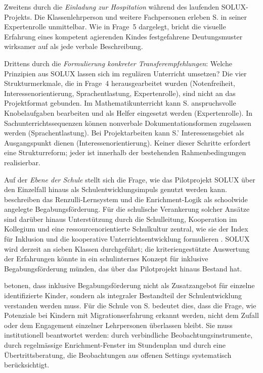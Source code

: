\documentclass[ngerman, a4paper]{article}
\begin{document}
Zweitens durch die \textit{Einladung zur Hospitation} während des laufenden
SOLUX-Projekts. Die Klassenlehrperson und weitere Fachpersonen erleben S. in
seiner Expertenrolle unmittelbar. Wie in Frage~5 dargelegt, bricht die
visuelle Erfahrung eines kompetent agierenden Kindes festgefahrene
Deutungsmuster wirksamer auf als jede verbale Beschreibung.

Drittens durch die \textit{Formulierung konkreter Transferempfehlungen}:
Welche Prinzipien aus SOLUX lassen sich im regulären Unterricht umsetzen?
Die vier Strukturmerkmale, die in Frage~4 herausgearbeitet wurden
(Notenfreiheit, Interessenorientierung, Sprachentlastung, Expertenrolle),
sind nicht an das Projektformat gebunden. Im Mathematikunterricht kann S.
anspruchsvolle Knobelaufgaben bearbeiten und als Helfer eingesetzt werden
(Expertenrolle). In Sachunterrichtssequenzen können nonverbale
Dokumentationsformen zugelassen werden (Sprachentlastung). Bei
Projektarbeiten kann S.' Interessensgebiet als Ausgangspunkt dienen
(Interessenorientierung). Keiner dieser Schritte erfordert eine
Strukturreform; jeder ist innerhalb der bestehenden Rahmenbedingungen
realisierbar.

Auf der \textit{Ebene der Schule} stellt sich die Frage, wie das
Pilotprojekt SOLUX über den Einzelfall hinaus als Schulentwicklungsimpuls
genutzt werden kann. \textcite[S.\,444--454]{renzullireis2021rls} beschreiben
das Renzulli-Lernsystem und die Enrichment-Logik als schoolwide angelegte
Begabungsförderung. Für die schulische Verankerung solcher Ansätze sind
darüber hinaus Unterstützung durch die Schulleitung, Kooperation im Kollegium
und eine ressourcenorientierte Schulkultur zentral, wie sie der Index für
Inklusion und die kooperative Unterrichtsentwicklung formulieren
\parencite{booth2019index,buholzer2010allegleich}. SOLUX wird derzeit an sieben
Klassen durchgeführt; die kriteriengestützte Auswertung der Erfahrungen
könnte in ein schulinternes Konzept für inklusive Begabungsförderung
münden, das über das Pilotprojekt hinaus Bestand hat.

\textcite{weigand2021separativ} betonen, dass inklusive Begabungsförderung nicht als
Zusatzangebot für einzelne identifizierte Kinder, sondern als integraler
Bestandteil der Schulentwicklung verstanden werden muss. Für die Schule von S. bedeutet dies,
dass die Frage, wie Potenziale bei Kindern mit Migrationserfahrung erkannt
werden, nicht dem Zufall oder dem Engagement einzelner Lehrpersonen
überlassen bleibt. Sie muss institutionell beantwortet werden: durch
verbindliche Beobachtungsinstrumente, durch regelmässige Enrichment-Fenster
im Stundenplan und durch eine Übertrittsberatung, die Beobachtungen aus
offenen Settings systematisch berücksichtigt.
\end{document}
